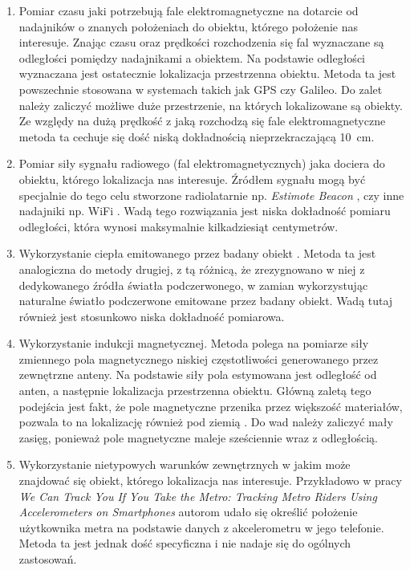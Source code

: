 \begin{enumerate}
 \item
 Pomiar czasu jaki potrzebują fale elektromagnetyczne na dotarcie od nadajników o znanych położeniach 
 do obiektu, którego położenie nas interesuje.
 Znając czasu oraz prędkości rozchodzenia się fal wyznaczane są odległości pomiędzy nadajnikami a obiektem.
 Na podstawie odległości wyznaczana jest ostatecznie lokalizacja przestrzenna obiektu. 
 Metoda ta jest powszechnie stosowana w systemach takich jak GPS \cite{bib:gps} czy Galileo.
 Do zalet należy zaliczyć możliwe duże przestrzenie, na których lokalizowane są obiekty.
 Ze względy na dużą prędkość z jaką rozchodzą się fale elektromagnetyczne metoda ta cechuje się dość niską 
 dokładnością nieprzekraczającą \SI{10}{cm}.
 
 \item
 Pomiar siły sygnału radiowego (fal elektromagnetycznych) jaka dociera do obiektu, którego lokalizacja nas interesuje.
 Źródłem sygnału mogą być specjalnie do tego celu stworzone radiolatarnie np. \textit{Estimote Beacon} \cite{bib:beacon},
 czy inne nadajniki np. WiFi \cite{bib:lokWiFi}.
 Wadą tego rozwiązania jest niska dokładność pomiaru odległości, która wynosi maksymalnie kilkadziesiąt centymetrów.  
 
 \item
 Wykorzystanie ciepła emitowanego przez badany obiekt \cite{bib:PIRsens}.
 Metoda ta jest analogiczna do metody drugiej, z tą różnicą, że zrezygnowano w niej
 z dedykowanego źródła światła podczerwonego, w zamian wykorzystując naturalne światło podczerwone emitowane 
 przez badany obiekt. Wadą tutaj również jest stosunkowo niska dokładność pomiarowa.
 
 \item
 Wykorzystanie indukcji magnetycznej. Metoda polega na pomiarze siły zmiennego pola magnetycznego niskiej częstotliwości
 generowanego przez zewnętrzne anteny. Na podstawie siły pola estymowana jest odległość 
 od anten, a następnie lokalizacja przestrzenna obiektu.
 Główną zaletą tego podejścia jest fakt, że pole magnetyczne przenika przez większość materiałów, pozwala to na 
 lokalizację również pod ziemią \cite{bib:chomiki}. Do wad należy zaliczyć mały zasięg, ponieważ pole magnetyczne maleje 
 sześciennie wraz z odległością.   
 
 \item 
 Wykorzystanie nietypowych warunków zewnętrznych w jakim może znajdować się obiekt, którego lokalizacja nas interesuje.
 Przykładowo w pracy \textit{We Can Track You If You Take the Metro: Tracking Metro
Riders Using Accelerometers on Smartphones} \cite{bib:metro} autorom udało się określić położenie
użytkownika metra na podstawie danych z akcelerometru w jego telefonie.
Metoda ta jest jednak dość specyficzna i nie nadaje się do ogólnych zastosowań. 
 
\end{enumerate}
 

